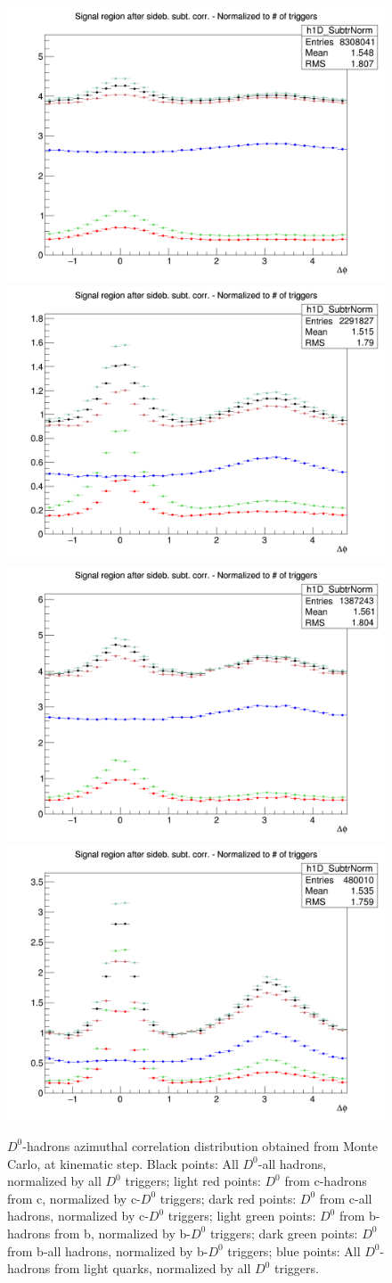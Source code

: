 \clearpage
\begin{figure}
{\includegraphics[width=.48\linewidth]{figures/MC_closure/AzimCorrDistr_Dzero_Canvas_PtIntBins4to5_PoolInt_thr03to1_Superimposed_Kine.png}}
{\includegraphics[width=.48\linewidth]{figures/MC_closure/AzimCorrDistr_Dzero_Canvas_PtIntBins4to5_PoolInt_thr1to99_Superimposed_Kine.png}} \\
{\includegraphics[width=.48\linewidth]{figures/MC_closure/AzimCorrDistr_Dzero_Canvas_PtIntBins9to10_PoolInt_thr03to1_Superimposed_Kine.png}}
{\includegraphics[width=.48\linewidth]{figures/MC_closure/AzimCorrDistr_Dzero_Canvas_PtIntBins9to10_PoolInt_thr1to99_Superimposed_Kine.png}}
\caption{$D^0$-hadrons azimuthal correlation distribution obtained from Monte Carlo, at kinematic step. Black points: All $D^0$-all hadrons, normalized by all $D^0$ triggers; light red points: $D^0$ from c-hadrons from c, normalized by c-$D^0$ triggers; dark red points: $D^0$ from c-all hadrons, normalized by c-$D^0$ triggers; light green points: $D^0$ from b-hadrons from b, normalized by b-$D^0$ triggers; dark green points: $D^0$ from b-all hadrons, normalized by b-$D^0$ triggers; blue points: All $D^0$-hadrons from light quarks, normalized by all $D^0$ triggers.
}
\end{figure}
